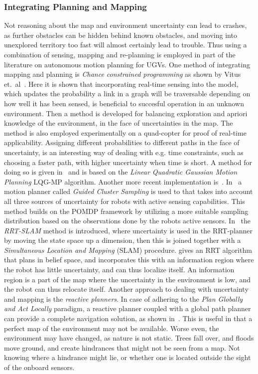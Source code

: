 \subsubsection{Integrating Planning and Mapping}
Not reasoning about the map and environment uncertainty can lead to crashes, as
further obstacles can be hidden behind known obstacles, and moving into
unexplored territory too fast will almost certainly lead to trouble. Thus using
a combination of sensing, mapping and re-planning is employed in part of the
literature on autonomous motion planning for UGVs. One method of integrating
mapping and planning is \textit{Chance constrained programming } as shown by
Vitus et.\ al~\cite{vitusHierarchicalMethodStochastic2012}. Here it is shown
that incorporating real-time sensing into the model, which updates the
probability a link in a graph will be traversable depending on how well it has
been sensed, is beneficial to succesful operation in an unknown environment.
Then a method is developed for balancing exploration and apriori knowledge of
the environment, in the face of uncertainties in the map. The method is also
employed experimentally on a quad-copter for proof of real-time applicability.
Assigning different probabilities to different paths in the face of uncertainty,
is an interesting way of dealing with e.g. time constraints, such as choosing a
faster path, with higher uncertainty when time is short. A method for doing so
is given in~\cite{vandenbergLQGMPOptimizedPath2011} and is based on the
\textit{Linear Quadratic Gaussian Motion Planning} LQG-MP algorithm. Another
more recent implementation is~\cite{blakeEfficientComputationCollision2018}.
In~\cite{kurniawatiGlobalMotionPlanning} a motion planner called
\textit{Guided Cluster Sampling} is used to that takes into account all three
sources of uncertainty for robots with active sensing capabilities. This method
builds on the POMDP framework by utilizing a more suitable sampling distribution
based on the observations done by the robots active sensors.
In~\cite{huangRRTSLAMMotionPlanning2008} the \textit{RRT-SLAM} method is
introduced, where uncertainty is used in the RRT-planner by moving the state
space up a dimension, then this is joined together with a \textit{Simultaneous
  Location and Mapping} (SLAM) procedure.
\cite{bryRapidlyexploringRandomBelief2011} gives an RRT algorithm that plans in
belief space, and incorporates this with an information region where the robot
has little uncertainty, and can thus localize itself. An information region is a
part of the map where the uncertainty in the environment is low, and the robot
can thus relocate itself. Another approach to dealing with uncertainty and
mapping is the \textit{reactive planners}. In case of adhering to the
\textit{Plan Globally and Act Locally} paradigm, a reactive planner coupled with
a global path planner can provide a complete navigation solution, as shown
in~\cite{djekouneSensorBasedNavigation2009}. This is useful in that a perfect
map of the environment may not be available. Worse even, the environment may
have changed, as nature is not static. Trees fall over, and floods move ground,
and create hindrances that might not be seen from a map. Not knowing where a
hindrance might lie, or whether one is located outside the sight of the onboard
sensors.

